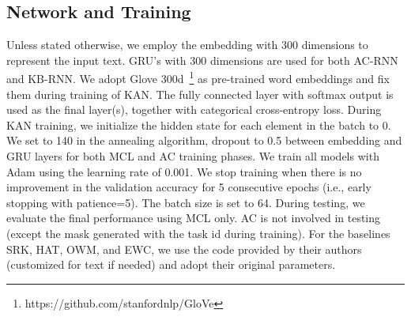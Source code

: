 \documentclass[runningheads]{llncs}
\begin{document}
\subsection{Network and Training}
Unless stated otherwise, we employ the embedding {\color{black} with 300 dimensions to represent the input text. GRU's with 300 dimensions are used for both AC-RNN and KB-RNN}. We adopt Glove 300d~\footnote{https://github.com/stanfordnlp/GloVe} as pre-trained word embeddings and fix them during training of KAN. The fully connected layer with softmax output is used as the final layer(s), together with categorical cross-entropy loss. During KAN training, we initialize the hidden state for each element in the batch to 0. We set  to 140 in the  annealing algorithm, dropout to 0.5 between embedding and GRU layers for both MCL and AC training phases. We train all models with Adam using the learning rate of 0.001. We stop training when there is no improvement in the validation accuracy for 5 consecutive epochs (i.e., early stopping with patience=5). The batch size is set to 64. During testing, we evaluate the final performance using MCL only. AC is not involved in testing (except the mask  generated with the task id  during training). For the baselines SRK, HAT, OWM, and EWC, we use the code provided by their authors (customized for text if needed) and adopt their original parameters. 



\begin{table}[t]
\centering
{}
\caption{Average accuracy of different models. \#Parameters refers to the number of parameters. LSC is based on Naive Bayes whose number of parameters is the sum of the number of unique words (vocabulary) in each dataset multiplied by the number of classes, which is 2 in our case. Paired -test is used to test the significance of the result of KAN against that of each baseline for ALL Tasks. P-values are given {\color{black}in column 4.}} \label{tab:OverallAccuracy}
\end{table}
\end{document}
